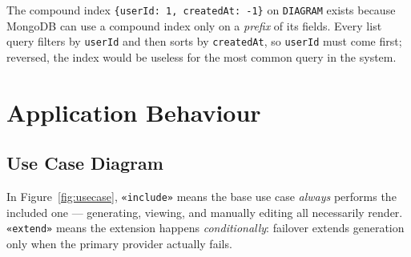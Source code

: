 \documentclass[11pt,a4paper]{article}
\begin{document}
\noindent The compound index \texttt{\{userId: 1, createdAt: -1\}} on
\texttt{DIAGRAM} exists because MongoDB can use a compound index only on a
\emph{prefix} of its fields. Every list query filters by \texttt{userId}
and then sorts by \texttt{createdAt}, so \texttt{userId} must come first;
reversed, the index would be useless for the most common query in the
system.

\section{Application Behaviour}
\label{sec:app-design}

\subsection{Use Case Diagram}
In Figure~\ref{fig:usecase}, \texttt{«include»} means the base use case
\emph{always} performs the included one --- generating, viewing, and
manually editing all necessarily render. \texttt{«extend»} means the
extension happens \emph{conditionally}: failover extends generation only
when the primary provider actually fails.
\end{document}

